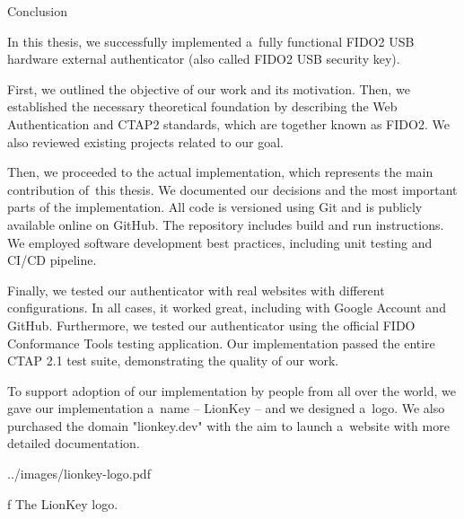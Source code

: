 \chap[conclusion] Conclusion

In this thesis, {\sbf we successfully implemented} a~fully functional FIDO2 USB hardware external authenticator (also called FIDO2 USB security key).

First, we outlined the objective of our work and its motivation. Then, we established the necessary theoretical foundation by describing the Web Authentication and CTAP2 standards, which are together known as FIDO2. We also reviewed existing projects related to our goal.

Then, we proceeded to the actual implementation, which represents the main contribution of~this thesis. We documented our decisions and the most important parts of the implementation. All code is versioned using Git and is publicly {\sbf available online on GitHub}. The repository includes build and run instructions. We employed software development best practices, including unit testing and CI/CD pipeline.

Finally, {\sbf we tested} our authenticator {\sbf with real websites} with different configurations. In all cases, {\sbf it worked great}, including with Google Account and GitHub.
Furthermore, we tested our authenticator using the official FIDO Conformance Tools testing application. Our implementation passed the entire CTAP 2.1 test suite, demonstrating the quality of our work.

To support adoption of our implementation by people from all over the world, we gave our implementation a~name – LionKey – and we designed a~logo. We also purchased the domain "lionkey.dev" with the aim to launch a~website with more detailed documentation.

\midinsert
\picheight=45mm \cinspic ../images/lionkey-logo.pdf
\caption/f The LionKey logo.
\endinsert
